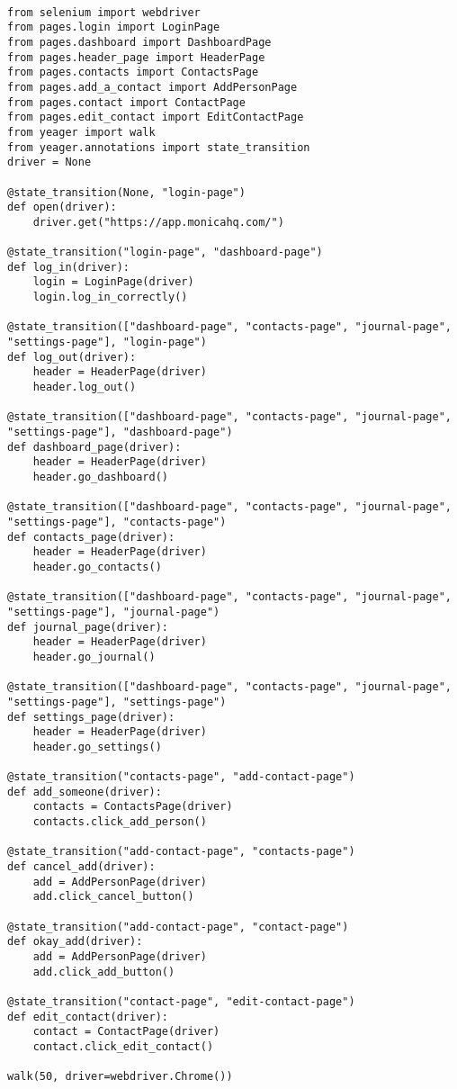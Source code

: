 {\tt
\begin{verbatim}
from selenium import webdriver
from pages.login import LoginPage
from pages.dashboard import DashboardPage
from pages.header_page import HeaderPage
from pages.contacts import ContactsPage
from pages.add_a_contact import AddPersonPage
from pages.contact import ContactPage
from pages.edit_contact import EditContactPage
from yeager import walk
from yeager.annotations import state_transition
driver = None

@state_transition(None, "login-page")
def open(driver):
    driver.get("https://app.monicahq.com/")

@state_transition("login-page", "dashboard-page")
def log_in(driver):
    login = LoginPage(driver)
    login.log_in_correctly()

@state_transition(["dashboard-page", "contacts-page", "journal-page", "settings-page"], "login-page")
def log_out(driver):
    header = HeaderPage(driver)
    header.log_out()

@state_transition(["dashboard-page", "contacts-page", "journal-page", "settings-page"], "dashboard-page")
def dashboard_page(driver):
    header = HeaderPage(driver)
    header.go_dashboard()

@state_transition(["dashboard-page", "contacts-page", "journal-page", "settings-page"], "contacts-page")
def contacts_page(driver):
    header = HeaderPage(driver)
    header.go_contacts()

@state_transition(["dashboard-page", "contacts-page", "journal-page", "settings-page"], "journal-page")
def journal_page(driver):
    header = HeaderPage(driver)
    header.go_journal()

@state_transition(["dashboard-page", "contacts-page", "journal-page", "settings-page"], "settings-page")
def settings_page(driver):
    header = HeaderPage(driver)
    header.go_settings()

@state_transition("contacts-page", "add-contact-page")
def add_someone(driver):
    contacts = ContactsPage(driver)
    contacts.click_add_person()

@state_transition("add-contact-page", "contacts-page")
def cancel_add(driver):
    add = AddPersonPage(driver)
    add.click_cancel_button()

@state_transition("add-contact-page", "contact-page")
def okay_add(driver):
    add = AddPersonPage(driver)
    add.click_add_button()

@state_transition("contact-page", "edit-contact-page")
def edit_contact(driver):
    contact = ContactPage(driver)
    contact.click_edit_contact()

walk(50, driver=webdriver.Chrome())

\end{verbatim}
}

